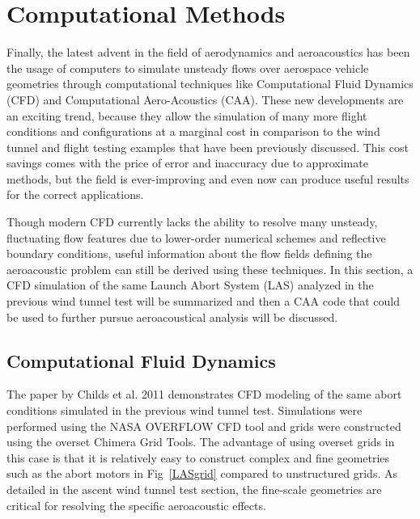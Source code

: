 \documentclass[]{aiaa-tc}%
\begin{document}
\section{Computational Methods}

Finally, the latest advent in the field of aerodynamics and aeroacoustics has been the usage of computers to simulate unsteady flows over aerospace vehicle geometries through computational techniques like Computational Fluid Dynamics (CFD) and Computational Aero-Acoustics (CAA).  These new developments are an exciting trend, because they allow the simulation of many more flight conditions and configurations at a marginal cost in comparison to the wind tunnel and flight testing examples that have been previously discussed.  This cost savings comes with the price of error and inaccuracy due to approximate methods, but the field is ever-improving and even now can produce useful results for the correct applications.

Though modern CFD currently lacks the ability to resolve many unsteady, fluctuating flow features due to lower-order numerical schemes and reflective boundary conditions, useful information about the flow fields defining the aeroacoustic problem can still be derived using these techniques.  In this section, a CFD simulation of the same Launch Abort System (LAS) analyzed in the previous wind tunnel test will be summarized and then a CAA code that could be used to further pursue aeroacoustical analysis will be discussed.

\subsection{Computational Fluid Dynamics}

The paper by Childs et al. 2011 \cite{OverflowOrionAbortGuidelines} demonstrates CFD modeling of the same abort conditions simulated in the previous wind tunnel test.  Simulations were performed using the NASA OVERFLOW CFD tool and grids were constructed using the overset Chimera Grid Tools.  The advantage of using overset grids in this case is that it is relatively easy to construct complex and fine geometries such as the abort motors in Fig~\ref{LASgrid} compared to unstructured grids.  As detailed in the ascent wind tunnel test section, the fine-scale geometries are critical for resolving the specific aeroacoustic effects.
\end{document}
